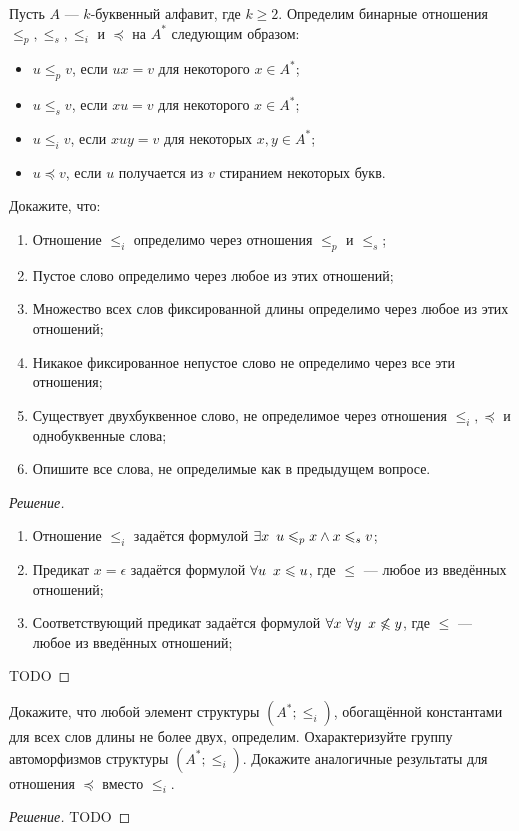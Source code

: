     \begin{problem}[4]
        Пусть \(A\) --- \(k\)-буквенный алфавит, где \(k \geqslant 2\). Определим бинарные отношения \(\leqslant_p, \leqslant_s, \leqslant_i\) и \(\preceq\) на \(A^*\) следующим образом:
        \begin{itemize}
            \item \(u \leqslant_p v\), если \(ux = v\) для некоторого \(x \in A^*\);
            \item \(u \leqslant_s v\), если \(xu = v\) для некоторого \(x \in A^*\);
            \item \(u \leqslant_i v\), если \(xuy = v\) для некоторых \(x, y \in A^*\);
            \item \(u \preceq v\), если \(u\) получается из \(v\) стиранием некоторых букв.
        \end{itemize}
        Докажите, что:
        \begin{enumerate}
            \item Отношение \(\leqslant_i\) определимо через отношения \(\leqslant_p\) и \(\leqslant_s\);
            \item Пустое слово определимо через любое из этих отношений;
            \item Множество всех слов фиксированной длины определимо через любое из этих отношений;
            \item Никакое фиксированное непустое слово не определимо через все эти отношения;
            \item Существует двухбуквенное слово, не определимое через отношения \(\leqslant_i, \preceq\) и однобуквенные слова;
            \item Опишите все слова, не определимые как в предыдущем вопросе.
        \end{enumerate}
    \end{problem}
    \begin{proof}[Решение]
        \begin{enumerate}
            \item Отношение \(\leqslant_i\) задаётся формулой \(\exists x \enskip u \leqslant_p x \land x \leqslant_s v\);
            \item Предикат \(x = \epsilon\) задаётся формулой \(\forall u \enskip x \leqslant u\), где \(\leqslant\) --- любое из введённых отношений;
            \item Соответствующий предикат задаётся формулой \(\forall x \ \forall y \enskip x \not\leqslant y\), где \(\leqslant\) --- любое из введённых отношений;
        \end{enumerate}
        TODO
    \end{proof}

    \begin{problem}[5]
        Докажите, что любой элемент структуры \((A^*; \leqslant_i)\), обогащённой константами для всех слов длины не более двух, определим. Охарактеризуйте группу автоморфизмов структуры \((A^*; \leqslant_i)\). Докажите аналогичные результаты для отношения \(\preceq\) вместо \(\leqslant_i\).   
    \end{problem}
    \begin{proof}[Решение]
        TODO
    \end{proof}
